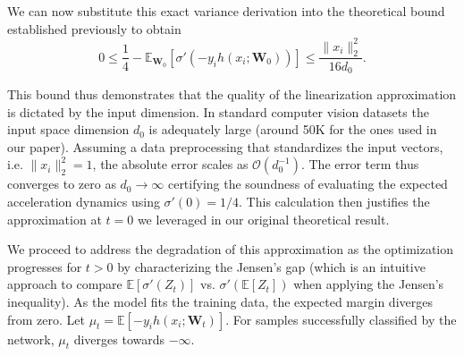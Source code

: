 \documentclass[letter,11pt]{article}
\begin{document}
We can now substitute this exact variance derivation into the theoretical bound established previously to obtain
\begin{equation}
0 \le \frac{1}{4} - \mathbb{E}_{\mathbf{W}_0}[\sigma'(-y_i h(x_i; \mathbf{W}_0))] \le \frac{\|x_i\|_2^2}{16 d_0}.
\end{equation}

This bound thus demonstrates that the quality of the linearization approximation is  dictated by the input dimension. In standard computer vision datasets the input space dimension $d_0$ is adequately large (around 50K for the ones used in our paper). Assuming a data preprocessing that standardizes the input vectors, i.e. $\|x_i\|_2^2 = 1$, the absolute error scales  as $\mathcal{O}(d_0^{-1})$. The error term thus converges to zero as $d_0 \to \infty$ certifying the soundness of evaluating the expected acceleration dynamics using $\sigma'(0) = 1/4$. This calculation then justifies the approximation at $t=0$ we leveraged in our original theoretical result.

We proceed to address the degradation of this approximation as the optimization progresses for $t > 0$ by characterizing the Jensen's gap (which is an intuitive approach to compare $\mathbb{E}[\sigma'(Z_t)]$ vs. $\sigma'(\mathbb{E}[Z_t])$ when applying the Jensen's inequality). As the model fits the training data, the expected margin diverges  from zero. Let $\mu_t = \mathbb{E}[-y_i h(x_i; \mathbf{W}_t)]$. For samples successfully classified by the network, $\mu_t$ diverges towards $-\infty$.
\end{document}
